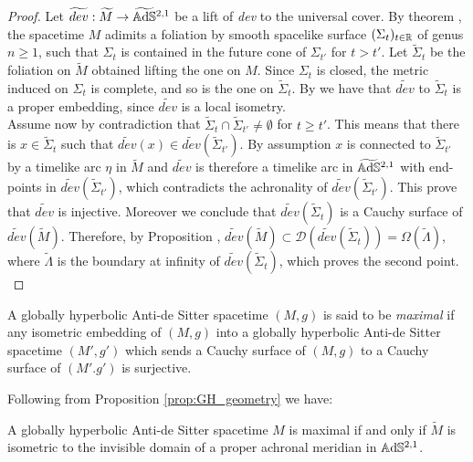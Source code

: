 \begin{proof}
    Let $\widetilde{dev}: \widetilde{M} \to \widetilde{\mathbb{A}\mathrm{d}\mathbb{S}}{}^{2,1}$ be a lift of \textit{dev} to the universal cover. By theorem , the spacetime $M$ adimits a foliation by smooth spacelike surface $(\Sigma_t)_{t\in\mathbb{R}}$ of genus $n\geq 1$, such that $\Sigma_t$ is contained in the future cone of $\Sigma_{t'}$ for $t > t'$. Let $\widetilde{\Sigma}_t$ be the foliation on $\widetilde{M}$ obtained lifting the one on $M$. Since $\Sigma_t$ is closed, the metric induced on $\Sigma_t$ is complete, and so is the one on $\widetilde{\Sigma}_t$. By  we have that $\widetilde{dev}$ to $\widetilde{\Sigma}_t$ is a proper embedding, since $\widetilde{dev}$ is a local isometry.\\
    Assume now by contradiction that $\widetilde{\Sigma}_t \cap \widetilde{\Sigma}_{t'} \neq \emptyset$ for $t \geq t'$. This means that there is $x \in \widetilde{\Sigma}_t$ such that $\widetilde{dev}(x) \in \widetilde{dev}(\widetilde{\Sigma}_{t'})$. By assumption $x$ is connected to $\widetilde{\Sigma}_{t'}$ by a timelike arc $\eta$ in $\widetilde{M}$ and $\widetilde{dev}$ is therefore a timelike arc in $\widetilde{\mathbb{A}\mathrm{d}\mathbb{S}}{}^{2,1}$ with end-points in $\widetilde{dev}(\widetilde{\Sigma}_{t'})$, which contradicts the achronality of $\widetilde{dev}(\widetilde{\Sigma}_{t'})$. This prove that $\widetilde{dev}$ is injective. Moreover we conclude that $\widetilde{dev}(\widetilde{\Sigma}_t)$ is a Cauchy surface of $\widetilde{dev}(\widetilde{M})$. Therefore, by Proposition , $\widetilde{dev}(\widetilde{M}) \subset \mathcal{D}(\widetilde{dev}(\widetilde{\Sigma}_t)) = \Omega(\widetilde{\Lambda})$, where $\widetilde{\Lambda}$ is the boundary at infinity of $\widetilde{dev}(\widetilde{\Sigma}_t)$, which proves the second point.\\
\end{proof}
\begin{definition}
    A globally hyperbolic Anti-de Sitter spacetime $(M,g)$ is said to be \textit{maximal} if any isometric embedding of $(M,g)$ into a globally hyperbolic Anti-de Sitter spacetime $(M',g')$ which sends a Cauchy surface of $(M,g)$ to a Cauchy surface of $(M'.g')$ is surjective.
\end{definition}
Following from Proposition \ref{prop:GH_geometry} we have:
\begin{corollary}
    A globally hyperbolic Anti-de Sitter spacetime $M$ is maximal if and only if $\widetilde{M}$ is isometric to the invisible domain of a proper achronal meridian in $\mathbb{A}\mathrm{d}\mathbb{S}^{2,1}$.
\end{corollary}

